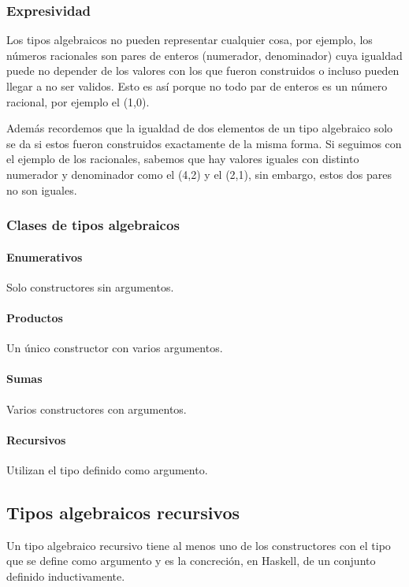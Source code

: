 \subsubsection{Expresividad}
Los tipos algebraicos no pueden representar cualquier cosa, por ejemplo, los números racionales son pares de enteros (numerador, denominador) cuya igualdad puede no depender de los valores con los que fueron construidos o incluso pueden llegar a no ser validos. Esto es así porque no todo par de enteros es un número racional, por ejemplo el (1,0). 

Además recordemos que la igualdad de dos elementos de un tipo algebraico solo se da si estos fueron construidos exactamente de la misma forma. Si seguimos con el ejemplo de los racionales, sabemos que hay valores iguales con distinto numerador y denominador como el (4,2) y el (2,1), sin embargo, estos dos pares no son iguales.

\subsubsection{Clases de tipos algebraicos}

\paragraph{Enumerativos} Solo constructores sin argumentos.

\paragraph{Productos} Un único constructor con varios argumentos.

\paragraph{Sumas} Varios constructores con argumentos.

\paragraph{Recursivos} Utilizan el tipo definido como argumento.

\subsection{Tipos algebraicos recursivos}
Un tipo algebraico recursivo tiene al menos uno de los constructores con el tipo que se define como argumento y es la concreción, en Haskell, de un conjunto definido inductivamente.

